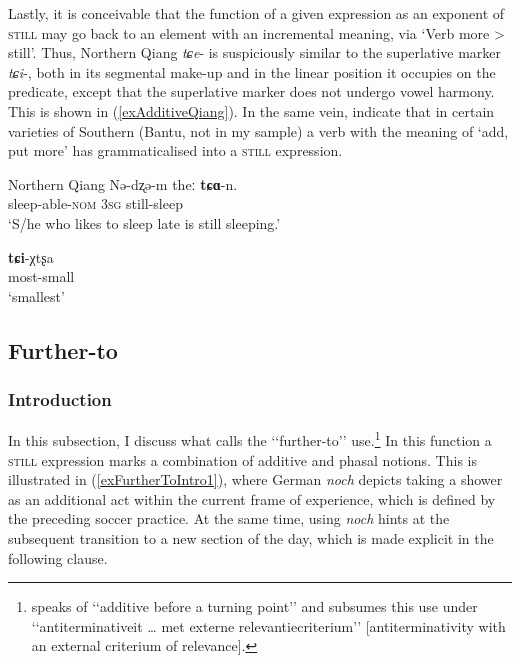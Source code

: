 {Lastly, it is conceivable that the function of a given expression as an exponent of \textsc{still} may go back to an element with an incremental meaning, via \lq Verb more > still\rq{}. Thus, Northern Qiang \mbox{\textit{tɕe}-} is suspiciously similar to the superlative marker \mbox{\textit{tɕi}-}, both in its segmental make-up and in the linear position it occupies on the predicate, except that the superlative marker does not undergo vowel harmony. This is shown in (\ref{exAdditiveQiang}). In the same vein, \textcite[88]{HeineEtAl1984} indicate that in certain varieties of Southern  (Bantu, not in my sample) a verb with the meaning of \lq add, put more\rq{ }has grammaticalised into a \textsc{still} expression.

\begin{exe}
	\ex \label{exAdditiveQiang}
	\begin{xlist}
		\exi{}Northern Qiang
		\ex
		\gll Nə-dʐə-m theː \textbf{tɕɑ}-n.\\
	sleep-able-\textsc{nom} 3\textsc{sg} still-sleep\\
	\glt \lq S/he who likes to sleep late is still sleeping.'

	\ex{}
	\gll \textbf{tɕi}-χtʂa\\
	most-small\\
	\glt \lq smallest\rq{ }\parencite[214, 228]{LaPollaHuang2003}
	\end{xlist}
\end{exe}

\subsection{Further-to}\label{sectionFurtherTo}
\subsubsection{Introduction}
In this subsection, I discuss what \textcite{Klein2018} calls the \lq\lq further-to\rq\rq{ }use.\footnote{\textcite{Nederstigt2003} speaks of \lq\lq additive before a turning point\rq\rq{ }and \textcite{Vandeweghe1984} subsumes this use under \lq\lq antiterminativeit … met externe relevantiecriterium\rq\rq{ }[antiterminativity with an external criterium of relevance].} In this function a \textsc{still} expression marks a combination of additive and phasal notions. This is illustrated in (\ref{exFurtherToIntro1}), where German \textit{noch} depicts taking a shower as an additional act within the current frame of experience, which is defined by the preceding soccer practice. At the same time, using \textit{noch} hints at the subsequent transition to a new section of the day, which is made explicit in the following clause.

}
